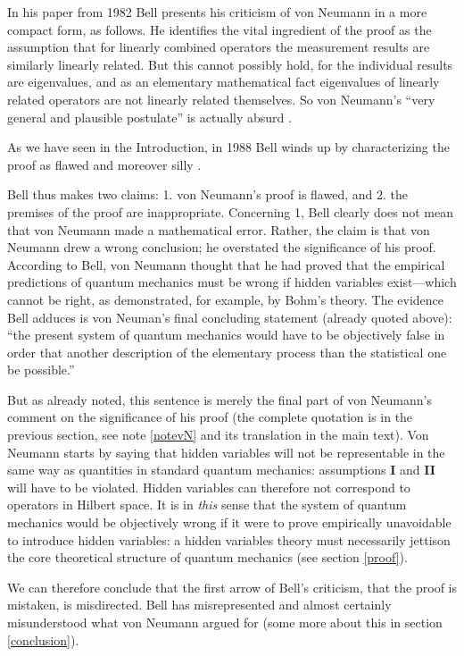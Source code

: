 \documentclass[11pt]{article}
\begin{document}
In his paper from 1982 \cite{bell82} Bell presents his criticism of von Neumann in a more compact form, as follows. He identifies the vital ingredient of the proof as the assumption that for linearly combined operators the measurement results are similarly linearly related. But this cannot possibly hold, for the individual results are eigenvalues, and as an elementary mathematical fact eigenvalues of linearly related operators are not linearly related themselves. So von Neumann's ``very general and plausible postulate'' is actually absurd \cite[p.\@ 994]{bell82}.

As we have seen in the Introduction, in 1988 Bell winds up by characterizing the proof as flawed and moreover silly \cite{bell88}.

Bell thus makes two claims: 1. von Neumann's proof is flawed, and 2. the premises of the proof are inappropriate. Concerning 1, Bell clearly does not mean that von Neumann made a mathematical error. Rather, the claim is that von Neumann drew a wrong conclusion; he overstated the significance of his proof. According to Bell, von Neumann thought that he had proved that the empirical predictions of quantum mechanics must be wrong if hidden variables exist---which cannot be right, as demonstrated, for example, by Bohm's theory. The evidence Bell adduces is von Neuman's final concluding statement (already quoted above): ``the present system of quantum mechanics would have to be objectively false in order that another description of the elementary process than the statistical one be possible.''

But as already noted, this sentence is merely the final part of von Neumann's comment on the significance of his proof (the complete quotation is in the previous section, see note \ref{notevN} and its translation in the main text). Von Neumann starts by saying that hidden variables will not be representable in the same way as quantities in standard quantum mechanics: assumptions \textbf{I} and \textbf{II} will have to be violated. Hidden variables can therefore not correspond to operators in Hilbert space. It is in \emph{this} sense that the system of quantum mechanics would be objectively wrong if it were to prove empirically unavoidable to introduce hidden variables: a hidden variables theory must necessarily jettison the core theoretical structure of quantum mechanics (see section \ref{proof}).

We can therefore conclude that the first arrow of Bell's criticism, that the proof is mistaken, is misdirected. Bell has misrepresented and almost certainly misunderstood what von Neumann argued for (some more about this in section \ref{conclusion}).
\end{document}
